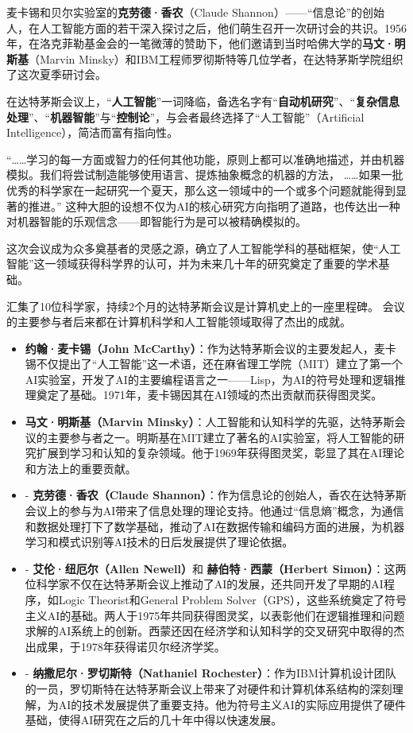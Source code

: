 麦卡锡和贝尔实验室的{\bf 克劳德·香农}（Claude Shannon）——“信息论”的创始人，在人工智能方面的若干深入探讨之后，他们萌生召开一次研讨会的共识。1956年，在洛克菲勒基金会的一笔微薄的赞助下，他们邀请到当时哈佛大学的{\bf 马文·明斯基}（Marvin Minsky）和IBM工程师罗彻斯特等几位学者，在达特茅斯学院组织了这次夏季研讨会。

在达特茅斯会议上，“{\bf 人工智能}”一词降临，备选名字有“{\bf 自动机研究}”、“{\bf 复杂信息处理}”、“{\bf 机器智能}”与“{\bf 控制论}”，与会者最终选择了“人工智能”（Artificial Intelligence），简洁而富有指向性。


“……学习的每一方面或智力的任何其他功能，原则上都可以准确地描述，并由机器模拟。我们将尝试制造能够使用语言、提炼抽象概念的机器的方法，
……如果一批优秀的科学家在一起研究一个夏天，那么这一领域中的一个或多个问题就能得到显著的推进。”
这种大胆的设想不仅为AI的核心研究方向指明了道路，也传达出一种对机器智能的乐观信念——即智能行为是可以被精确模拟的。

这次会议成为众多奠基者的灵感之源，确立了人工智能学科的基础框架，使“人工智能”这一领域获得科学界的认可，并为未来几十年的研究奠定了重要的学术基础。


汇集了10位科学家，持续2个月的达特茅斯会议是计算机史上的一座里程碑。
会议的主要参与者后来都在计算机科学和人工智能领域取得了杰出的成就。
\begin{itemize}
\item  {\bf 约翰·麦卡锡（John McCarthy）}：作为达特茅斯会议的主要发起人，麦卡锡不仅提出了“人工智能”这一术语，还在麻省理工学院（MIT）建立了第一个AI实验室，开发了AI的主要编程语言之一——Lisp，为AI的符号处理和逻辑推理奠定了基础。1971年，麦卡锡因其在AI领域的杰出贡献而获得图灵奖。
\item  {\bf 马文·明斯基（Marvin Minsky）}：人工智能和认知科学的先驱，达特茅斯会议的主要参与者之一。明斯基在MIT建立了著名的AI实验室，将人工智能的研究扩展到学习和认知的复杂领域。他于1969年获得图灵奖，彰显了其在AI理论和方法上的重要贡献。
\item -  {\bf 克劳德·香农（Claude Shannon）}：作为信息论的创始人，香农在达特茅斯会议上的参与为AI带来了信息处理的理论支持。他通过“信息熵”概念，为通信和数据处理打下了数学基础，推动了AI在数据传输和编码方面的进展，为机器学习和模式识别等AI技术的日后发展提供了理论依据。
\item -  {\bf 艾伦·纽厄尔（Allen Newell）}和 {\bf 赫伯特·西蒙（Herbert Simon）}：这两位科学家不仅在达特茅斯会议上推动了AI的发展，还共同开发了早期的AI程序，如Logic Theorist和General Problem Solver（GPS），这些系统奠定了符号主义AI的基础。两人于1975年共同获得图灵奖，以表彰他们在逻辑推理和问题求解的AI系统上的创新。西蒙还因在经济学和认知科学的交叉研究中取得的杰出成果，于1978年获得诺贝尔经济学奖。
\item -  {\bf 纳撒尼尔·罗切斯特（Nathaniel Rochester）}：作为IBM计算机设计团队的一员，罗切斯特在达特茅斯会议上带来了对硬件和计算机体系结构的深刻理解，为AI的技术发展提供了重要支持。他为符号主义AI的实际应用提供了硬件基础，使得AI研究在之后的几十年中得以快速发展。
\end{itemize}

